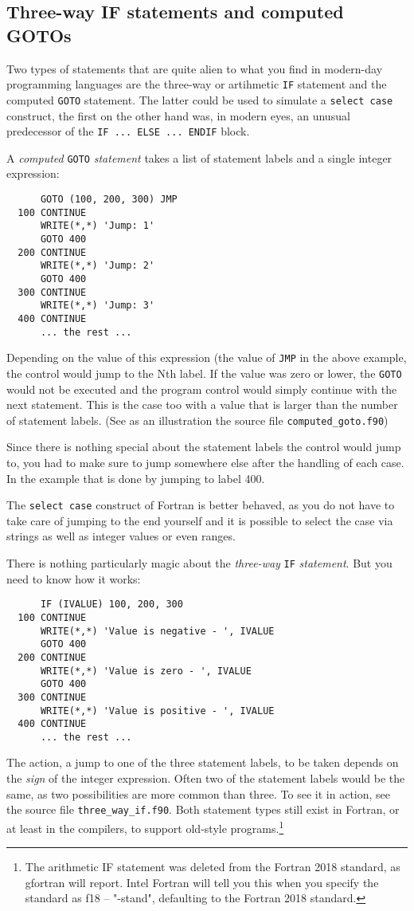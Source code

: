 \subsection{Three-way IF statements and computed GOTOs}
Two types of statements that are quite alien to what you find in modern-day programming
languages are the three-way or artihmetic \verb+IF+ statement and the computed \verb+GOTO+ statement.
The latter could be used to simulate a \verb+select case+ construct, the first on the
other hand was, in modern eyes, an unusual predecessor of the \verb+IF ... ELSE ... ENDIF+
block.

A \emph{computed} \verb+GOTO+ \emph{statement} takes a list of statement labels and a single integer expression:
%
\begin{verbatim}
      GOTO (100, 200, 300) JMP
  100 CONTINUE
      WRITE(*,*) 'Jump: 1'
      GOTO 400
  200 CONTINUE
      WRITE(*,*) 'Jump: 2'
      GOTO 400
  300 CONTINUE
      WRITE(*,*) 'Jump: 3'
  400 CONTINUE
      ... the rest ...
\end{verbatim}
%
Depending on the value of this expression (the value of \verb+JMP+ in the above example,
the control would jump to the Nth label. If the value was zero or lower, the \verb+GOTO+
would not be executed and the program control would simply continue with the next statement.
This is the case too with a value that is larger than the number of statement labels.
(See as an illustration the source file \verb+computed_goto.f90+)

Since there is nothing special about the statement labels the control would jump to, you had
to make sure to jump somewhere else after the handling of each case. In the example that
is done by jumping to label 400.

The \verb+select case+ construct of Fortran is better behaved, as you do not have to
take care of jumping to the end yourself and it is possible to select the case via strings
as well as integer values or even ranges.

There is nothing particularly magic about the \emph{three-way} \verb+IF+ \emph{statement}.
But you need to know how it works:
%
\begin{verbatim}
      IF (IVALUE) 100, 200, 300
  100 CONTINUE
      WRITE(*,*) 'Value is negative - ', IVALUE
      GOTO 400
  200 CONTINUE
      WRITE(*,*) 'Value is zero - ', IVALUE
      GOTO 400
  300 CONTINUE
      WRITE(*,*) 'Value is positive - ', IVALUE
  400 CONTINUE
      ... the rest ...
\end{verbatim}
%
The action, a jump to one of the three statement labels, to be taken depends on the
\emph{sign} of the integer expression. Often two of the statement labels would be the same,
as two possibilities are more common than three. To see it in action, see the source
file \verb+three_way_if.f90+. Both statement types still exist in Fortran, or at least
in the compilers, to support old-style programs.\footnote{The arithmetic IF statement
was deleted from the Fortran 2018 standard, as gfortran will report. Intel Fortran
will tell you this when you specify the standard as f18 -- "-stand", defaulting to the
Fortran 2018 standard.}


